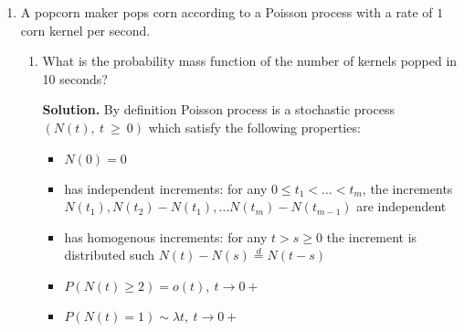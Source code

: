 \documentclass[a4paper, 12pt]{article}
\newcommand{\task}[2]{
    \item #1
    \begin{mdframed} \textbf{Solution. } #2 \end{mdframed}
}
\begin{document}
\begin{enumerate}
\begin{enumerate}
{              \[
                  P(t > 3600) = \int\limits_{3600}^{\infty} \lambda e^{-\lambda x} dx =
                  -e^{-\lambda x} \big|_{3600}^{\infty} = e^{-3600 \lambda}.
              \]
              }
              \task{What is the probability that the alarm clock rings for the Ist time after the 2nd hour?}
              {
              Let's calculate a probability using PDF (2 hour is equal to 7200 seconds):
              \[
                  P(t > 3600) = \int\limits_{7200}^{\infty} \lambda e^{-\lambda x} dx =
                  -e^{-\lambda x} \big|_{7200}^{\infty} = e^{-7200 \lambda}.
              \]
              }
              \task{If you knew that the alarm clock will not ring within the 1st hour, what is the probability
                  that it will ring for the lst time after the 2nd hour?}
              {
                  We calculate it using a definition of conditional probability:
                  \[
                      P(t > 7200 | t > 3600) = \frac{P(t > 7200 \cap t > 3600)}{P(t > 3600)}
                  \]
                  But, let's see that $\{t > 7200 \}$ is only a subset of event $\{ t > 3600 \}$ so,
                  joint probability is equal to probability of a subset, so:
                  \[
                      P(t > 7200 | t > 3600) = \frac{P(t > 7200)}{P(t > 3600)} = \frac{e^{-7200 \lambda}}{e^{-3600 \lambda}} = e^{-3600 \lambda} = P(t > 3600)
                  \]
              }
          \end{enumerate}
    \item A popcorn maker pops corn according to a Poisson process with a rate of $1$ corn kernel per
          second.
          \begin{enumerate}
              \task{What is the probability mass function of the number of kernels popped in 10 seconds?}
              {
                  By definition Poisson process is a stochastic process $(N(t),~t~\geq~0)$ which
                  satisfy the following properties:
                  \begin{itemize}
                      \item $N(0) = 0$
                      \item has independent increments: for any $0 \leq t_1 < \dots < t_m$, the increments
                            $N(t_1), N(t_2) - N(t_1), \dots N(t_m) - N(t_{m-1}) $ are independent
                      \item has homogenous increments: for any $t > s \geq 0$ the increment is
                            distributed such $N(t) - N(s) \stackrel{d}{=} N(t-s)$
                      \item $P(N(t) \geq 2) = o(t),\ t\rightarrow 0+$
                      \item $P(N(t) = 1) \sim \lambda t,\ t\rightarrow 0+$
                  \end{itemize}

}
\end{enumerate}
\end{enumerate}
\end{document}
